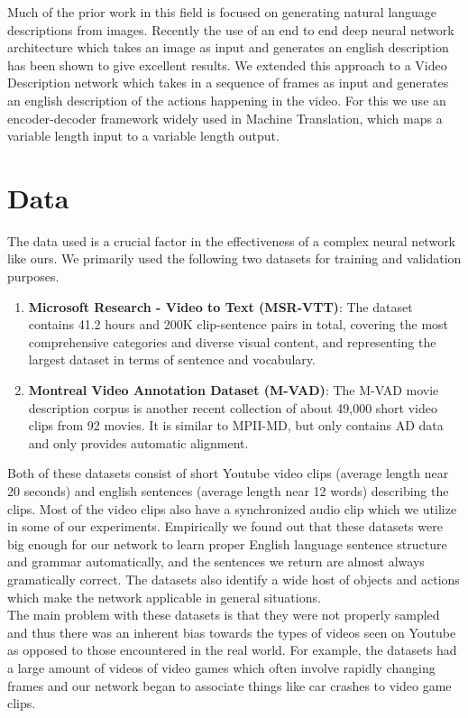 \documentclass[12pt]{article}
\begin{document}
		Much of the prior work in this field is focused on generating natural language descriptions from images. Recently the use of an end to end deep neural network architecture which takes an image as input and generates an english description has  been shown to give excellent results. We extended this approach to a Video Description network which takes in a sequence of frames as input and generates an english description of the actions happening in the video. For this we use an encoder-decoder framework widely used in Machine Translation, which maps a variable length input to a variable length output. 

	\section{Data}
The data used is a crucial factor in the effectiveness of a complex neural network like ours. We primarily used the following two datasets for training and validation purposes.
	\begin{enumerate}
		\item
			\textbf{Microsoft Research - Video to Text (MSR-VTT)}: The dataset contains 41.2 hours and 200K clip-sentence pairs in total, covering the most comprehensive categories and diverse visual content, and representing the largest dataset in terms of sentence and vocabulary.
		\item
			\textbf{Montreal Video Annotation Dataset (M-VAD)}: The M-VAD movie description corpus is another recent collection of about 49,000 short video clips from 92 movies. It is similar to MPII-MD, but only contains AD data and only provides automatic alignment.
		\end{enumerate}
		Both of these datasets consist of short Youtube video clips (average length near 20 seconds) and english sentences (average length near 12 words) describing the clips. Most of the video clips also have a synchronized audio clip which we utilize in some of our experiments. 
		Empirically we found out that these datasets were big enough for our network to learn proper English language sentence structure and grammar automatically, and the sentences we return are almost always gramatically correct. The datasets also identify a wide host of objects and actions which make the network applicable in general situations.\\
		The main problem with these datasets is that they were not properly sampled and thus there was an inherent bias towards the types of videos seen on Youtube as opposed to those encountered in the real world. For example, the datasets had a large amount of videos of video games which often involve rapidly changing frames and our network began to associate things like car crashes to video game clips. 
\end{document}
